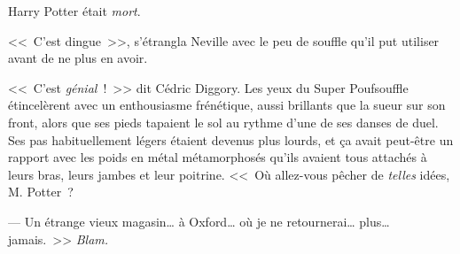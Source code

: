 Harry Potter était \emph{mort}.

\later

<<~C'est dingue~>>, s'étrangla Neville avec le peu de souffle qu'il put utiliser avant de ne plus en avoir.

<<~C'est \emph{génial}~!~>> dit Cédric Diggory. Les yeux du Super Poufsouffle étincelèrent avec un enthousiasme frénétique, aussi brillants que la sueur sur son front, alors que ses pieds tapaient le sol au rythme d'une de ses danses de duel. Ses pas habituellement légers étaient devenus plus lourds, et ça avait peut-être un rapport avec les poids en métal métamorphosés qu'ils avaient tous attachés à leurs bras, leurs jambes et leur poitrine. <<~Où allez-vous pêcher de \emph{telles} idées, M. Potter~?

--- Un étrange vieux magasin… à Oxford… où je ne retournerai… plus… jamais.~>> \emph{Blam.}
